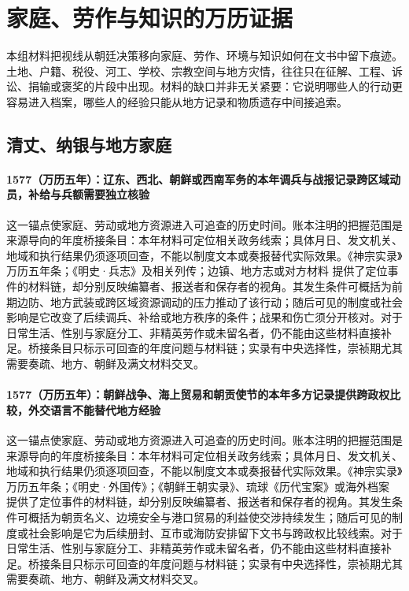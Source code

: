 \section{家庭、劳作与知识的万历证据}

本组材料把视线从朝廷决策移向家庭、劳作、环境与知识如何在文书中留下痕迹。土地、户籍、税役、河工、学校、宗教空间与地方灾情，往往只在征解、工程、诉讼、捐输或褒奖的片段中出现。材料的缺口并非无关紧要：它说明哪些人的行动更容易进入档案，哪些人的经验只能从地方记录和物质遗存中间接追索。

\subsection{清丈、纳银与地方家庭}

\paragraph{1577（万历五年）：辽东、西北、朝鲜或西南军务的本年调兵与战报记录跨区域动员，补给与兵额需要独立核验} 这一锚点使家庭、劳动或地方资源进入可追查的历史时间。账本注明的把握范围是来源导向的年度桥接条目：本年材料可定位相关政务线索；具体月日、发文机关、地域和执行结果仍须逐项回查，不能以制度文本或奏报替代实际效果。《神宗实录》万历五年条；《明史·兵志》及相关列传；边镇、地方志或对方材料 提供了定位事件的材料链，却分别反映编纂者、报送者和保存者的视角。其发生条件可概括为前期边防、地方武装或跨区域资源调动的压力推动了该行动；随后可见的制度或社会影响是它改变了后续调兵、补给或地方秩序的条件；战果和伤亡须分开核对。对于日常生活、性别与家庭分工、非精英劳作或未留名者，仍不能由这些材料直接补足。桥接条目只标示可回查的年度问题与材料链；实录有中央选择性，崇祯期尤其需要奏疏、地方、朝鲜及满文材料交叉。

\paragraph{1577（万历五年）：朝鲜战争、海上贸易和朝贡使节的本年多方记录提供跨政权比较，外交语言不能替代地方经验} 这一锚点使家庭、劳动或地方资源进入可追查的历史时间。账本注明的把握范围是来源导向的年度桥接条目：本年材料可定位相关政务线索；具体月日、发文机关、地域和执行结果仍须逐项回查，不能以制度文本或奏报替代实际效果。《神宗实录》万历五年条；《明史·外国传》；《朝鲜王朝实录》、琉球《历代宝案》或海外档案 提供了定位事件的材料链，却分别反映编纂者、报送者和保存者的视角。其发生条件可概括为朝贡名义、边境安全与港口贸易的利益使交涉持续发生；随后可见的制度或社会影响是它为后续册封、互市或海防安排留下文书与跨政权比较线索。对于日常生活、性别与家庭分工、非精英劳作或未留名者，仍不能由这些材料直接补足。桥接条目只标示可回查的年度问题与材料链；实录有中央选择性，崇祯期尤其需要奏疏、地方、朝鲜及满文材料交叉。

